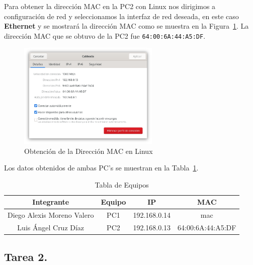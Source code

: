         Para obtener la dirección MAC en la PC2 con Linux nos dirigimos a configuración de red y seleccionamos la interfaz de red deseada, en este caso \textbf{Ethernet} y se mostrará la dirección MAC como se muestra en la Figura~\ref{fig:mac_linux}. La dirección MAC que se obtuvo de la PC2 fue \texttt{64:00:6A:44:A5:DF}.
        \begin{figure}[H]
            \centering
            \includegraphics[width=0.6\textwidth]{img/direccion_MAC_linux.png}
            \caption{Obtención de la Dirección MAC en Linux}
            \label{fig:mac_linux}
        \end{figure}

        Los datos obtenidos de ambas PC's se muestran en la Tabla~\ref{tab:tabla_equipos}.

        \begin{table}[H]
            \centering
            \begin{tabular}{c|c|c|c}
                \textbf{Integrante} & \textbf{Equipo} & \textbf{IP} & \textbf{MAC} \\
                \hline
                Diego Alexis Moreno Valero & PC1 & 192.168.0.14 & mac \\
                Luis Ángel Cruz Díaz & PC2 & 192.168.0.13 & 64:00:6A:44:A5:DF \\
            \end{tabular}
            \caption{Tabla de Equipos}
            \label{tab:tabla_equipos}
        \end{table}
    \subsection{Tarea 2.}
